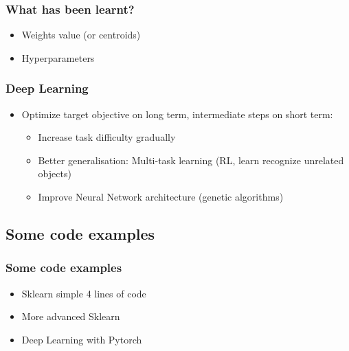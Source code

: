 \begin{frame}\frametitle{What has been learnt?}
   \begin{itemize}
      \item Weights value (or centroids)
      \item Hyperparameters
   \end{itemize}
\end{frame}


\begin{frame}\frametitle{Deep Learning}
   \begin{itemize}
      \item Optimize target objective on long term, intermediate steps on short term:
      \begin{itemize}
         \item Increase task difficulty gradually
         \item Better generalisation: Multi-task learning (RL, learn recognize unrelated objects)
         \item Improve Neural Network architecture (genetic algorithms)
      \end{itemize}
   \end{itemize}
\end{frame}


\subsection{Some code examples}

\begin{frame}\frametitle{Some code examples}
   \begin{itemize}
      \item Sklearn simple 4 lines of code
      \item More advanced Sklearn
      \item Deep Learning with Pytorch
   \end{itemize}
\end{frame}



